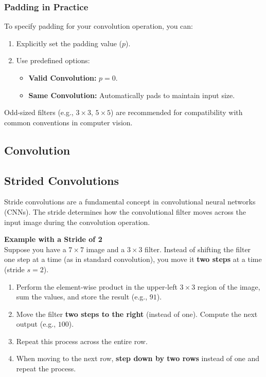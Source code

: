 \documentclass[letterpaper,12pt,notitlepage,twoside]{report}
\begin{document}
\subsubsection*{Padding in Practice}
To specify padding for your convolution operation, you can:
\begin{enumerate}
    \item Explicitly set the padding value (\(p\)).
    \item Use predefined options:
    \begin{itemize}
        \item \textbf{Valid Convolution:} \(p = 0\).
        \item \textbf{Same Convolution:} Automatically pads to maintain input size.
    \end{itemize}
\end{enumerate}

Odd-sized filters (e.g., \(3 \times 3\), \(5 \times 5\)) are recommended for compatibility with common conventions in computer vision.

\subsection{Convolution}
\subsection*{Strided Convolutions}
Stride convolutions are a fundamental concept in convolutional neural networks (CNNs). The stride determines how the convolutional filter moves across the input image during the convolution operation.

\textbf{Example with a Stride of 2} \\
Suppose you have a $7 \times 7$ image and a $3 \times 3$ filter. Instead of shifting the filter one step at a time (as in standard convolution), you move it \textbf{two steps} at a time (stride $s = 2$).

\begin{enumerate}
    \item Perform the element-wise product in the upper-left $3 \times 3$ region of the image, sum the values, and store the result (e.g., $91$).
    \item Move the filter \textbf{two steps to the right} (instead of one). Compute the next output (e.g., $100$).
    \item Repeat this process across the entire row.
    \item When moving to the next row, \textbf{step down by two rows} instead of one and repeat the process.
\end{enumerate}
\end{document}
